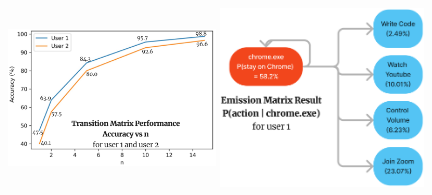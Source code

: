 \documentclass[final]{beamer}
\newlength{\colwidth}
\begin{document}
\begin{frame}[t]
\begin{columns}[t]
\begin{column}{\colwidth}
\begin{block}
      \begin{figure}
        \includegraphics[width=0.49\textwidth, height=15cm]{transition-mt.jpeg}
        \hspace{\fill}
        \includegraphics[width=0.48\textwidth, height=15cm]{emission-mt1.jpeg}
        \end{figure}


\end{block}
\end{column}
\end{columns}
\end{frame}
\end{document}
